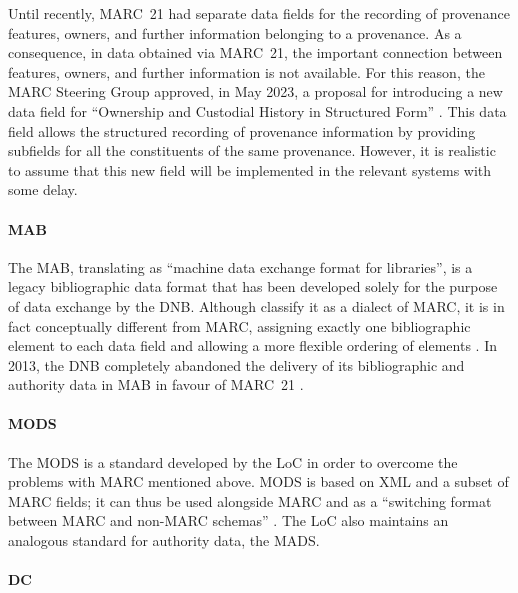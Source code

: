 Until recently, MARC~21 had separate data fields for the recording of provenance features, owners,
and further information belonging to a provenance. As a consequence,
in data obtained via MARC~21, the important connection between features, owners,
and further information is not available.
For this reason, the MARC Steering Group approved, in May 2023, a proposal
for introducing a new data field for
\enquote{Ownership and Custodial History in Structured Form} \autocite{MARC361proposal}.
This data field allows the structured recording of provenance information
by providing subfields for all the constituents of the same provenance.
However, it is realistic to assume that this new field
will be implemented in the relevant systems with some delay.

\paragraph{MAB}

The \gls{MAB}, translating as \enquote{machine data exchange format for libraries},
is a legacy bibliographic data format that has been developed solely for the purpose of data exchange
by the \gls{DNB}.
Although \textcite[p.204]{Hider2008} classify it as a dialect of \gls{MARC},
it is in fact conceptually different from \gls{MARC},
assigning exactly one bibliographic element to each data field
and allowing a more flexible ordering of elements \autocite{WikiMAB}.
In 2013, the \gls{DNB} completely abandoned the delivery of its bibliographic and authority data in MAB
in favour of \gls{MARC}~21 \autocite{MAB}.

\paragraph{MODS}

The \gls{MODS} is a standard developed by the \gls{LoC}
in order to overcome the problems with \gls{MARC} mentioned above.
MODS is based on \gls{XML} and a subset of MARC fields;
it can thus be used alongside MARC and as a \enquote{switching format
between MARC and non-MARC schemas} \autocite[p.219]{Hider2008}.
The LoC also maintains an analogous standard for authority data,
the \gls{MADS}.

\paragraph{DC}

